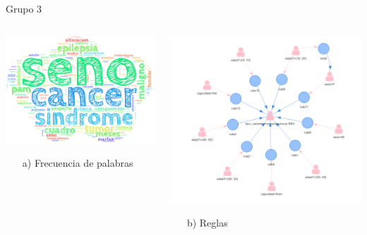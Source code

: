 \documentclass[xcolor=dvipsnames]{beamer}
\begin{document}
\begin{frame}{Grupo 3}
\begin{columns}
\begin{column}{0.5\textwidth}
\begin{center}
\includegraphics[width=1\textwidth]{cluster3} \\
\begin{itemize}
    \item[a)] Frecuencia de palabras
\end{itemize}
\end{center}
\end{column}
\begin{column}{0.5\textwidth}  %
    \begin{center}
     \includegraphics[width=1\textwidth]{reglas3_2.png}
    \begin{itemize}
    \centering
    \item[b)] Reglas
    \end{itemize}
    \end{center}
\end{column}
\end{columns}
\end{frame}
\end{document}
